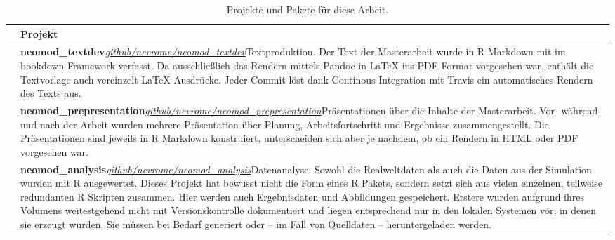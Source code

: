 \documentclass[openany,twoside,twocolumn]{book}
\begin{document}
\begin{table}

\caption{\label{tab:projects}Projekte und Pakete für diese Arbeit.}
\centering
\fontsize{8}{10}\selectfont
\begin{tabu} to 
\toprule
 & Projekt\\
 & \textbf{neomod\_textdev}\newline \textit{\href{https://www.github.com/nevrome/neomod\_textdev}{github/nevrome/neomod\_textdev}}\newline Textproduktion. Der Text der Masterarbeit wurde in R Markdown mit im bookdown Framework verfasst. Da ausschließlich das Rendern mittels Pandoc in LaTeX ins PDF Format vorgesehen war, enthält die Textvorlage auch vereinzelt LaTeX Ausdrücke. Jeder Commit löst dank Continous Integration mit Travis ein automatisches Rendern des Texts aus.\\
\addlinespace \hline {} & \textbf{neomod\_prepresentation}\newline \textit{\href{https://www.github.com/nevrome/neomod\_prepresentation}{github/nevrome/neomod\_prepresentation}}\newline Präsentationen über die Inhalte der Masterarbeit. Vor- während und nach der Arbeit wurden mehrere Präsentation über Planung, Arbeitsfortschritt und Ergebnisse zusammengestellt. Die Präsentationen sind jeweils in R Markdown konstruiert, unterscheiden sich aber je nachdem, ob ein Rendern in HTML oder PDF vorgesehen war.\\
\addlinespace \hline {} & \textbf{neomod\_analysis}\newline \textit{\href{https://www.github.com/nevrome/neomod\_analysis}{github/nevrome/neomod\_analysis}}\newline Datenanalyse. Sowohl die Realweltdaten als auch die Daten aus der Simulation wurden mit R ausgewertet. Dieses Projekt hat bewusst nicht die Form eines R Pakets, sondern setzt sich aus vielen einzelnen, teilweise redundanten R Skripten zusammen. Hier werden auch Ergebnisdaten und Abbildungen gespeichert. Erstere wurden aufgrund ihres Volumens weitestgehend  nicht mit Versionskontrolle dokumentiert und liegen entsprechend nur in den lokalen Systemen vor, in denen sie erzeugt wurden. Sie müssen bei Bedarf generiert oder -- im  Fall von Quelldaten -- heruntergeladen werden.\\

\end{tabu}
\end{table}
\end{document}

